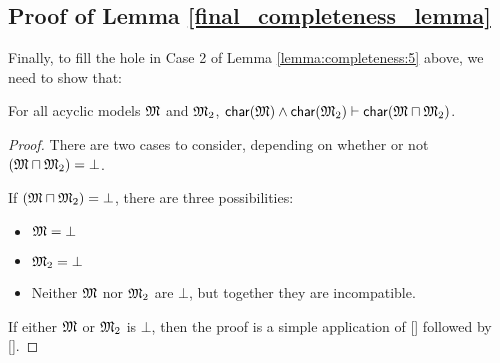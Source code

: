 \subsection{Proof of Lemma \ref{final_completeness_lemma}}
\label{prooflemma6}

Finally, to fill the hole in Case 2 of Lemma \ref{lemma:completeness:5} above, we need to show that:
\begin{lemma}
\label{final_completeness_lemma}
For all acyclic models $\frak{M}$ and $\frak{M}_2$, $  \mathsf{char}(\frak{M}) \land  \mathsf{char}(\frak{M}_2) \vdash  \mathsf{char}(\frak{M} \sqcap \frak{M}_2)$.
\end{lemma}

\begin{proof}

There are two cases to consider, depending on whether or not $(\frak{M} \sqcap \frak{M}_2) = \bot$.


If $(\frak{M} \sqcap \frak{M}_2) = \bot$, there are three possibilities:
\begin{itemize}
\item
$\frak{M} = \bot$
\item
$\frak{M}_2 = \bot$
\item
Neither $\frak{M}$ nor $\frak{M}_2$ are $\bot$, but together they are incompatible. 
\end{itemize}
If either $\frak{M}$ or $\frak{M}_2$ is $\bot$, then the proof is a simple application of [] followed by [].


\end{proof}
